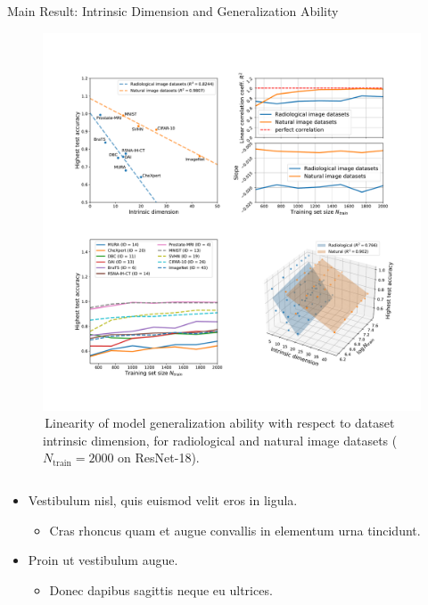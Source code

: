\documentclass[final,hyperref={pdfpagelabels=false}]{beamer}
\begin{document}
\begin{frame}[t]
\begin{columns}[t]
\begin{column}{.3\textwidth}
\begin{block}{Main Result: Intrinsic Dimension and Generalization Ability}

\begin{figure}
    \label{fig:linear}
    \includegraphics[width=0.95\linewidth]{frompaper/main_fig_multi_0.pdf}
     \caption{\,Linearity of model generalization ability with respect to dataset intrinsic dimension, for \textcolor{paperblue}{radiological} and \textcolor{paperorange}{natural} image datasets ($N_\text{train}=2000$ on ResNet-18).}
\end{figure}

\begin{columns}
\begin{column}{.54\textwidth} %
    \begin{itemize}
    \item Vestibulum nisl, quis euismod velit eros in ligula.
    \begin{itemize}
    \item Cras rhoncus quam et augue convallis in elementum urna tincidunt.
    \end{itemize}
    \item Proin ut vestibulum augue.
    \begin{itemize}
    \item Donec dapibus sagittis neque eu ultrices.
    \end{itemize}
    \end{itemize}
    \end{column}
    

\end{columns}
\end{block}
\end{column}
\end{columns}
\end{frame}
\end{document}
